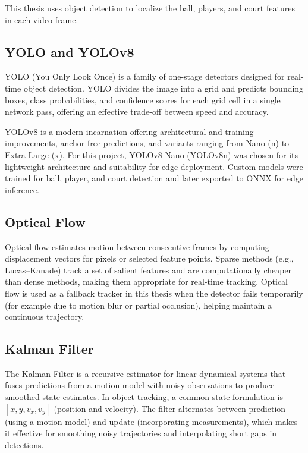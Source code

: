 This thesis uses object detection to localize the ball, players, and court features in each video frame.

\subsection{YOLO and YOLOv8}

YOLO (You Only Look Once) is a family of one-stage detectors designed for real-time object detection. YOLO divides the image into a grid and predicts bounding boxes, class probabilities, and confidence scores for each grid cell in a single network pass, offering an effective trade-off between speed and accuracy.

YOLOv8 is a modern incarnation offering architectural and training improvements, anchor-free predictions, and variants ranging from Nano (n) to Extra Large (x). For this project, YOLOv8 Nano (YOLOv8n) was chosen for its lightweight architecture and suitability for edge deployment. Custom models were trained for ball, player, and court detection and later exported to ONNX for edge inference.

\subsection{Optical Flow}

Optical flow estimates motion between consecutive frames by computing displacement vectors for pixels or selected feature points. Sparse methods (e.g., Lucas--Kanade) track a set of salient features and are computationally cheaper than dense methods, making them appropriate for real-time tracking. Optical flow is used as a fallback tracker in this thesis when the detector fails temporarily (for example due to motion blur or partial occlusion), helping maintain a continuous trajectory.

\subsection{Kalman Filter}

The Kalman Filter is a recursive estimator for linear dynamical systems that fuses predictions from a motion model with noisy observations to produce smoothed state estimates. In object tracking, a common state formulation is \([x, y, v_x, v_y]\) (position and velocity). The filter alternates between prediction (using a motion model) and update (incorporating measurements), which makes it effective for smoothing noisy trajectories and interpolating short gaps in detections.

